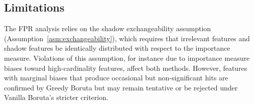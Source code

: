 \documentclass[runningheads]{llncs}
\begin{document}






\subsection{Limitations}
\label{sec:discussion:limitations}

The FPR analysis relies on the shadow exchangeability assumption (Assumption~\ref{asm:exchangeability}), which requires that irrelevant features and shadow features be identically distributed with respect to the importance measure. Violations of this assumption, for instance due to importance measure biases toward high-cardinality features, affect both methods. However, features with marginal biases that produce occasional but non-significant hits are confirmed by Greedy Boruta but may remain tentative or be rejected under Vanilla Boruta's stricter criterion.
\end{document}

